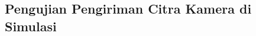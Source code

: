\subsection{Pengujian Pengiriman Citra Kamera di Simulasi}
\label{subsec:citrasimulasi}

\textcolor{red}{\lipsum[1-2]}
